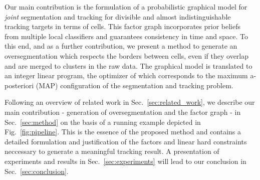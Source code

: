 \documentclass[10pt,twocolumn,letterpaper]{article}
\begin{document}
Our main contribution is the formulation of a probabilistic graphical model for 
\emph{joint} segmentation and tracking for divisible and almost indistinguishable tracking targets 
in terms of cells.
This factor graph incorporates prior beliefs from multiple local classifiers and guarantees
consistency in time and space.
To this end, and as a further contribution, we present a method to
generate an oversegmentation which respects the borders between cells, even if they overlap and are merged to
clusters in the raw data.
The graphical model is translated to an integer linear program, the optimizer of which corresponds
to the maximum a-posteriori (MAP) configuration of the segmentation and tracking problem.


Following an overview of related work in Sec.~\ref{sec:related_work}, we describe our main
contribution - generation of oversegmentation and the factor graph - in Sec.~\ref{sec:method} on the 
basis of a running example depicted in Fig.~\ref{fig:pipeline}. This
is the essence of the proposed method %
and contains a
detailed formulation and justification of the factors and linear hard constraints neccessary to
generate a meaningful tracking result. A presentation of experiments and results in
Sec.~\ref{sec:experiments} will lead to our conclusion in Sec.~\ref{sec:conclusion}.


\end{document}
